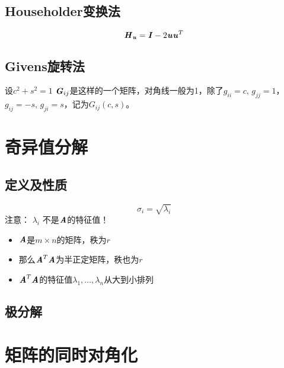 \subsection{Householder变换法}
\label{sub:Householder变换法}

\begin{definition}
    $$
    \boldsymbol{\mathit{H}}_{\boldsymbol{\mathit{u}}} = \boldsymbol{\mathit{I}} - 2\boldsymbol{\mathit{u}} \boldsymbol{\mathit{u}}^T
    $$
\end{definition}

\subsection{Givens旋转法}
\label{sub:Givens旋转法}

\begin{definition}
    设$c^2 + s^2 = 1$
    $\boldsymbol{\mathit{G}}_{ij}$是这样的一个矩阵，对角线一般为1，除了$g_{ii}=c,\,g_{jj}=1$，$g_{ij}=-s,\,g_{ji}=s$，记为$G_{ij}(c,s)$。
\end{definition}

\section{奇异值分解}
\label{sec:奇异值分解}

\subsection{定义及性质}
\label{sub:定义及性质}

\begin{definition}[奇异值]
    $$
    \sigma_i = \sqrt{\lambda_i}
    $$
    注意： $\lambda_i$ 不是$\boldsymbol{\mathit{A}}$的特征值！
    \begin{itemize}
        \item $\boldsymbol{\mathit{A}}$是$m \times n$的矩阵，秩为$r$
        \item 那么$\boldsymbol{\mathit{A}}^T\boldsymbol{\mathit{A}}$为半正定矩阵，秩也为$r$
        \item $\boldsymbol{\mathit{A}}^T\boldsymbol{\mathit{A}}$的特征值$\lambda_1, \ldots, \lambda_n$从大到小排列
    \end{itemize}
\end{definition}

\subsection{极分解}
\label{sub:极分解}

\section{矩阵的同时对角化}
\label{sec:矩阵的同时对角化}


